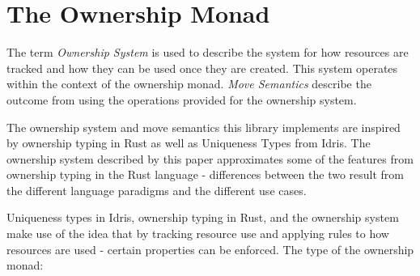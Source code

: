 \documentclass[onehalf,11pt]{beavtex}
\begin{document}



\chapter{The Ownership Monad}

The term \textit{Ownership System} is used to describe the system for how
resources are tracked and how they can be used once they are created. This
system operates within the context of the ownership monad.
\textit{Move Semantics} describe the outcome from using the operations provided
for the ownership system.

The ownership system and move semantics this library implements are inspired by
ownership typing in Rust as well as Uniqueness Types
from Idris.\cite{rust_book_ownership} \cite{idris_uniqueness_types}
The ownership system described by this paper approximates some of the
features from ownership typing in the Rust language - differences between
the two result from the different language paradigms and the different use cases.

Uniqueness types in Idris, ownership typing in Rust, and the ownership system
make use of the idea that by tracking resource use and applying rules to how
resources are used - certain properties can be enforced.
The type of the ownership monad:

\end{document}
